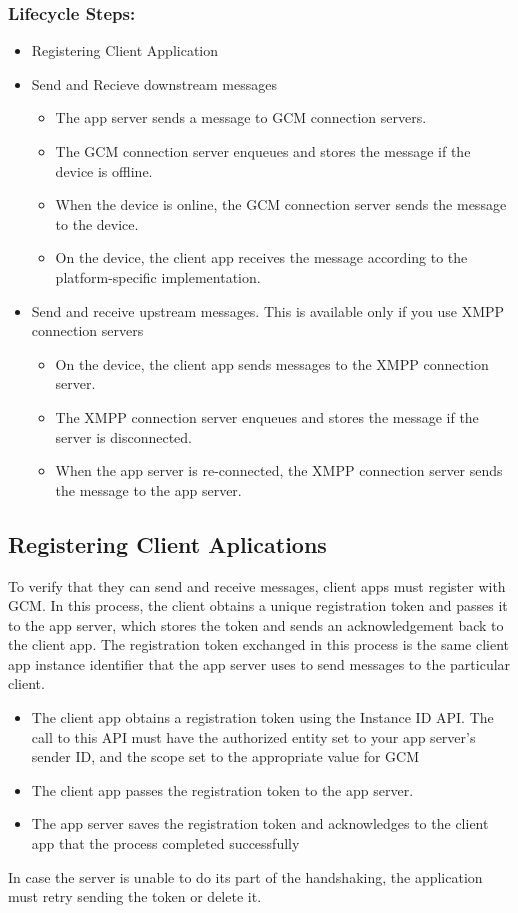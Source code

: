 \subsubsection{Lifecycle Steps: }
\begin{itemize}
	\item Registering Client Application
	\item Send and Recieve downstream messages
		\begin{itemize}
			\item The app server sends a message to GCM connection servers.
			\item The GCM connection server enqueues and stores the message if the device is offline.
			\item When the device is online, the GCM connection server sends the message to the device.
			\item On the device, the client app receives the message according to the platform-specific implementation.
		\end{itemize}
	\item Send and receive upstream messages. This is available only if you use XMPP connection servers
		\begin{itemize}
			\item On the device, the client app sends messages to the XMPP connection server.
			\item The XMPP connection server enqueues and stores the message if the server is disconnected.
			\item When the app server is re-connected, the XMPP connection server sends the message to the app server.
		\end{itemize}
\end{itemize}
\subsection{Registering Client Aplications}
To verify that they can send and receive messages, client apps must register with GCM. In this process, the client obtains a unique registration token and passes it to the app server, which stores the token and sends an acknowledgement back to the client app. The registration token exchanged in this process is the same client app instance identifier that the app server uses to send messages to the particular client.
\begin{itemize}
	\item The client app obtains a registration token using the Instance ID API. The call to this API must have the authorized entity set to your app server's sender ID, and the scope set to the appropriate value for GCM 
	\item The client app passes the registration token to the app server.
	\item The app server saves the registration token and acknowledges to the client app that the process completed successfully
\end{itemize}
In case the server is unable to do its part of the handshaking, the application must retry sending the token or delete it.
